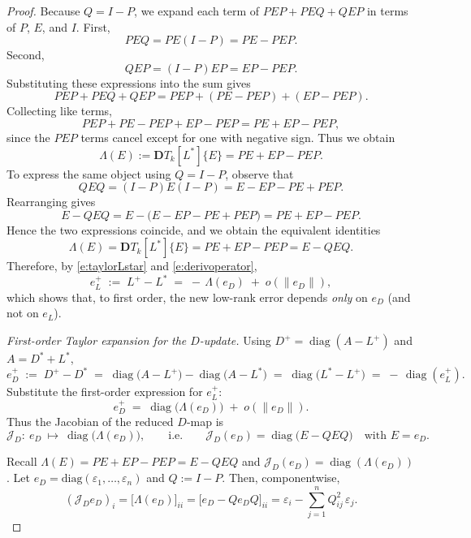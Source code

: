\documentclass[final,hidelinks,onefignum,onetabnum]{siamart250211}
\providecommand{\1}{\mathbf{1}}
\theoremstyle{plain}
\begin{document}
\begin{proof}
Because $Q = I-P$, we expand each term of 
\(
PEP + PEQ + QEP
\)
in terms of $P$, $E$, and $I$.
First,
\[
PEQ = P E (I-P) = PE - PEP.
\]
Second,
\[
QEP = (I-P) E P = EP - PEP.
\]
Substituting these expressions into the sum gives
\[
PEP + PEQ + QEP
= PEP + (PE - PEP) + (EP - PEP).
\]
Collecting like terms,
\[
PEP + PE - PEP + EP - PEP
= PE + EP - PEP,
\]
since the $PEP$ terms cancel except for one with negative sign.
Thus we obtain
\[
\Lambda(E)
:=\mathbf{D}T_k[L^*]\{E\}
= PE + EP - PEP.
\]
To express the same object using $Q = I-P$, observe that
\[
QEQ = (I-P)E(I-P)
= E - EP - PE + PEP.
\]
Rearranging gives
\[
E - QEQ = E - \bigl(E - EP - PE + PEP\bigr)
= PE + EP - PEP.
\]
Hence the two expressions coincide, and we obtain the equivalent identities
\begin{equation} \label{e:derivoperator}
    \Lambda(E)
= \mathbf{D}T_k[L^*]\{E\}
= PE + EP - PEP
= E - QEQ.    
\end{equation}
Therefore, by \eqref{e:taylorLstar} and \eqref{e:derivoperator}, 
\[
e_L^+ \;:=\; L^+ - L^*
\;=\; -\,\Lambda(e_D) \;+\; o(\|e_D\|),
\]
which shows that, to first order, the new low-rank error depends \emph{only} on $e_D$ (and not on $e_L$).

\smallskip
\emph{First-order Taylor expansion for the $D$-update.}
Using $D^+=\operatorname{diag}(A-L^+)$ and $A=D^*+L^*$,
\[
e_D^+ \;:=\; D^+ - D^*
\;=\; \operatorname{diag}\big(A-L^+\big) - \operatorname{diag}\big(A-L^*\big)
\;=\; \operatorname{diag}\big(L^*-L^+\big)
\;=\; -\,\operatorname{diag}(e_L^+).
\]
Substitute the first-order expression for $e_L^+$:
\[
e_D^+ \;=\; \operatorname{diag}\!\big(\Lambda(e_D)\big) \;+\; o(\|e_D\|).
\]
Thus the Jacobian of the reduced $D$-map is
\[
\mathcal{J}_D:\ e_D \ \mapsto\ \operatorname{diag}\!\big(\Lambda(e_D)\big),
\qquad\text{i.e.}\qquad
\mathcal{J}_D(e_D)=\operatorname{diag}\!\big(E - QEQ\big)
\quad\text{with }E=e_D.
\]


\smallskip
Recall $\Lambda(E)=PE+EP-PEP=E-QEQ$ and $\mathcal{J}_D(e_D)=\operatorname{diag}(\Lambda(e_D))$.
Let $e_D=\mathrm{diag}(\varepsilon_1,\ldots,\varepsilon_n)$ and $Q:=I-P$.
Then, componentwise,
\begin{equation} \label{eq:jacobian_comp}
    (\mathcal{J}_D e_D)_i
=\big[\Lambda(e_D)\big]_{ii}
=\big[e_D - Q e_D Q\big]_{ii}
=\varepsilon_i-\sum_{j=1}^n Q_{ij}^2\,\varepsilon_j.
\end{equation}


\end{proof}
\end{document}
